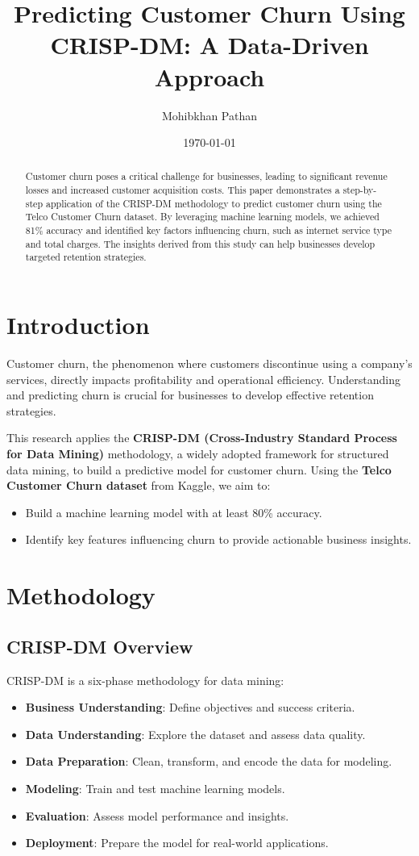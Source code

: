 \documentclass[12pt]{article}
\title{Predicting Customer Churn Using CRISP-DM: A Data-Driven Approach}
\author{Mohibkhan Pathan}
\date{\today}
\begin{document}
\maketitle

\begin{abstract}
Customer churn poses a critical challenge for businesses, leading to significant revenue losses and increased customer acquisition costs. This paper demonstrates a step-by-step application of the CRISP-DM methodology to predict customer churn using the Telco Customer Churn dataset. By leveraging machine learning models, we achieved 81\% accuracy and identified key factors influencing churn, such as internet service type and total charges. The insights derived from this study can help businesses develop targeted retention strategies.
\end{abstract}

\section{Introduction}
Customer churn, the phenomenon where customers discontinue using a company’s services, directly impacts profitability and operational efficiency. Understanding and predicting churn is crucial for businesses to develop effective retention strategies.

This research applies the \textbf{CRISP-DM (Cross-Industry Standard Process for Data Mining)} methodology, a widely adopted framework for structured data mining, to build a predictive model for customer churn. Using the \textbf{Telco Customer Churn dataset} from Kaggle, we aim to:
\begin{itemize}
    \item Build a machine learning model with at least 80\% accuracy.
    \item Identify key features influencing churn to provide actionable business insights.
\end{itemize}

\section{Methodology}

\subsection{CRISP-DM Overview}
CRISP-DM is a six-phase methodology for data mining:
\begin{itemize}
    \item \textbf{Business Understanding}: Define objectives and success criteria.
    \item \textbf{Data Understanding}: Explore the dataset and assess data quality.
    \item \textbf{Data Preparation}: Clean, transform, and encode the data for modeling.
    \item \textbf{Modeling}: Train and test machine learning models.
    \item \textbf{Evaluation}: Assess model performance and insights.
    \item \textbf{Deployment}: Prepare the model for real-world applications.
\end{itemize}
\end{document}

